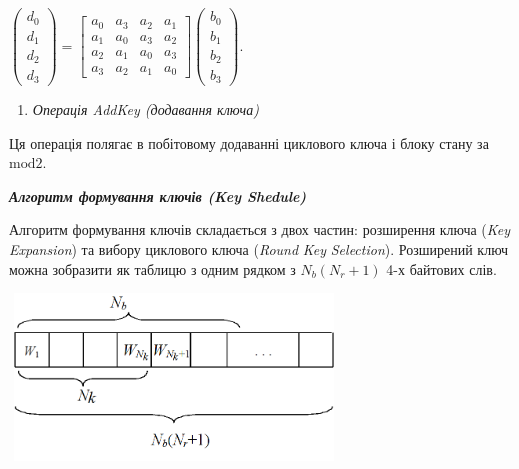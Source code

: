 {\centering

${\left(\begin{matrix}d_{{0}}\\d_{{1}}\\d_{{2}}\\d_{{3}}\end{matrix}\right)=\left[\begin{matrix}a_{{0}}&a_{{3}}&a_{{2}}&a_{{1}}\\a_{{1}}&a_{{0}}&a_{{3}}&a_{{2}}\\a_{{2}}&a_{{1}}&a_{{0}}&a_{{3}}\\a_{{3}}&a_{{2}}&a_{{1}}&a_{{0}}\end{matrix}\right]\left(\begin{matrix}b_{{0}}\\b_{{1}}\\b_{{2}}\\b_{{3}}\end{matrix}\right)}$.
\par}


\bigskip


\bigskip

\liststyleWWviiiNumxxxi
\setcounter{saveenum}{\value{enumi}}
\begin{enumerate}
\setcounter{enumi}{\value{saveenum}}
\item {\itshape
Операція AddKey (додавання ключа)}
\end{enumerate}

\bigskip

Ця операція полягає в побітовому додаванні циклового ключа і блоку стану за 
${\text{mod}2}$. 


\bigskip


\bigskip

{\centering\bfseries\itshape
Алгоритм формування ключів (Key Shedule)
\par}


\bigskip


\bigskip

Алгоритм формування ключів складається з двох частин: розширення ключа
(\textit{Key}\textit{ }\textit{Expansion}) та вибору циклового ключа
(\textit{Round}\textit{ }\textit{Key}\textit{ }\textit{Selection}). Розширений
ключ можна зобразити як таблицю з одним рядком з  ${N_{{b}}(N_{{r}}+1)}$ 4-х
байтових слів. 


\bigskip

{\centering  $ $
\includegraphics[width=3.3437in,height=1.75in]{crypt-img/crypt-img335.png}
\par}

